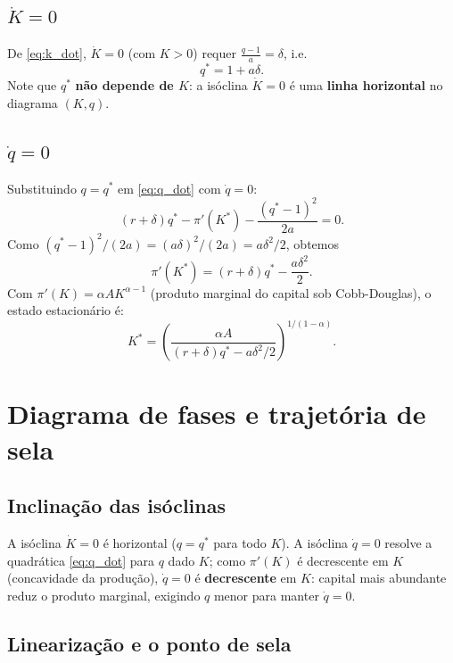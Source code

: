 \documentclass[11pt,a4paper]{article}
\begin{document}
\subsection{$\dot K=0$}

De \eqref{eq:k_dot}, $\dot K=0$ (com $K>0$) requer $\tfrac{q-1}{a}=\delta$,
i.e.
\begin{equation}\label{eq:q_star}
  \boxed{q^* = 1 + a\delta.}
\end{equation}
Note que $q^*$ \textbf{não depende de $K$}: a isóclina $\dot K=0$ é uma
\textbf{linha horizontal} no diagrama $(K,q)$.

\subsection{$\dot q=0$}

Substituindo $q=q^*$ em \eqref{eq:q_dot} com $\dot q=0$:
\[
  (r+\delta)q^* - \pi'(K^*) - \frac{(q^*-1)^2}{2a} = 0.
\]
Como $(q^*-1)^2/(2a) = (a\delta)^2/(2a) = a\delta^2/2$, obtemos
\begin{equation}\label{eq:pi_prime_star}
  \pi'(K^*) = (r+\delta)q^* - \frac{a\delta^2}{2}.
\end{equation}
Com $\pi'(K) = \alpha A K^{\alpha-1}$ (produto marginal do capital sob
Cobb-Douglas), o estado estacionário é:
\begin{equation}\label{eq:k_star}
  \boxed{K^* = \left(\frac{\alpha A}{(r+\delta)q^* - a\delta^2/2}\right)^{1/(1-\alpha)}.}
\end{equation}

\section{Diagrama de fases e trajetória de sela}

\subsection{Inclinação das isóclinas}

A isóclina $\dot K=0$ é horizontal ($q=q^*$ para todo $K$). A isóclina
$\dot q=0$ resolve a quadrática \eqref{eq:q_dot} para $q$ dado $K$; como
$\pi'(K)$ é decrescente em $K$ (concavidade da produção), $\dot q=0$ é
\textbf{decrescente} em $K$: capital mais abundante reduz o produto
marginal, exigindo $q$ menor para manter $\dot q=0$.

\subsection{Linearização e o ponto de sela}
\end{document}

